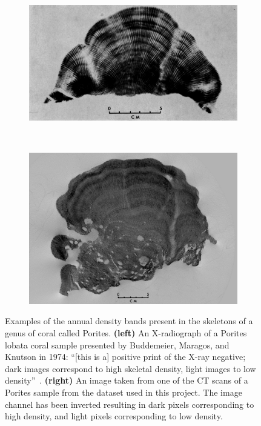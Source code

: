 \begin{figure}[t]
    \centering
    \begin{subfigure}[t]{0.49\textwidth}
        \centering
        \includegraphics[width=1\textwidth, valign=c]{images/knutson.jpg}
    \end{subfigure}
    ~
    \begin{subfigure}[t]{0.49\textwidth}
        \centering
        \includegraphics[width=1\textwidth, valign=c]{images/our-coral.png}
    \end{subfigure}
    \caption{Examples of the annual density bands present in the skeletons of a genus of coral called Porites. \textbf{(left)} An X-radiograph of a Porites lobata coral sample presented by Buddemeier, Maragos, and Knutson in 1974: ``[this is a] positive print of the X-ray negative; dark images correspond to high skeletal density, light images to low density''~\cite{coralimage}. \textbf{(right)} An image taken from one of the CT scans of a Porites sample from the dataset used in this project. The image channel has been inverted resulting in dark pixels corresponding to high density, and light pixels corresponding to low density.}
    \label{fig:densityexample}
\end{figure}

